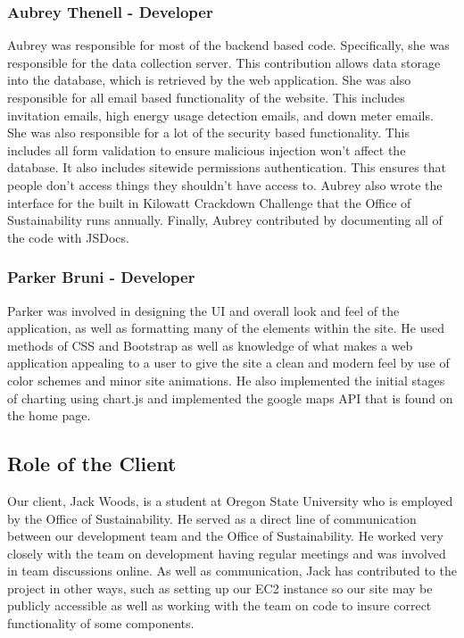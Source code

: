 \documentclass[journal,10pt,onecolumn,compsoc]{IEEEtran}
\begin{document}
	\subsubsection{Aubrey Thenell - Developer}
	Aubrey was responsible for most of the backend based code. Specifically, she was responsible for the data collection server. This contribution allows data storage into the database, which is retrieved by the web application. She was also responsible for all email based functionality of the website. This includes invitation emails, high energy usage detection emails, and down meter emails. She was also responsible for a lot of the security based functionality. This includes all form validation to ensure malicious injection won't affect the database. It also includes sitewide permissions authentication. This ensures that people don't access things they shouldn't have access to. Aubrey also wrote the interface for the built in Kilowatt Crackdown Challenge that the Office of Sustainability runs annually. Finally, Aubrey contributed by documenting all of the code with JSDocs.
	\subsubsection{Parker Bruni - Developer}
	
	Parker was involved in designing the UI and overall look and feel of the application, as well as formatting many of the elements within the site. He used methods of CSS and Bootstrap as well as knowledge of what makes a web application appealing to a user to give the site a clean and modern feel by use of color schemes and minor site animations. He also implemented the initial stages of charting using chart.js and implemented the google maps API that is found on the home page. 
	
	\subsection{Role of the Client}
	Our client, Jack Woods, is a student at Oregon State University who is employed by the Office of Sustainability. He served as a direct line of communication between our development team and the Office of Sustainability. He worked very closely with the team on development having regular meetings and was involved in team discussions online. As well as communication, Jack has contributed to the project in other ways, such as setting up our EC2 instance so our site may be publicly accessible as well as working with the team on code to insure correct functionality of some components.
	
\end{document}
